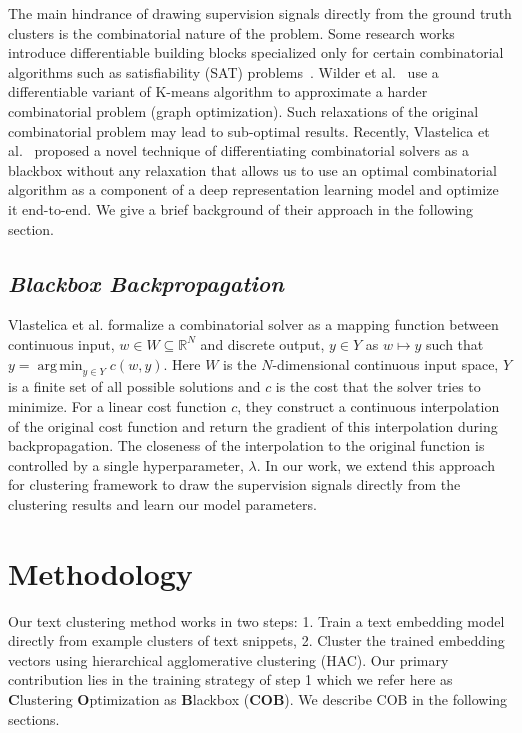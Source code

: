 \documentclass[11pt,a4paper]{article}
\DeclareMathOperator*{\argmin}{arg\,min}
\begin{document}
The main hindrance of drawing supervision signals directly from the ground truth clusters is the combinatorial nature of the problem. Some research works introduce differentiable building blocks specialized only for certain combinatorial algorithms such as satisfiability (SAT) problems~\cite{wang2019satnet}. Wilder et al.~\cite{wilder2019end} use a differentiable variant of K-means algorithm to approximate a harder combinatorial problem (graph optimization). Such relaxations of the original combinatorial problem may lead to sub-optimal results. Recently, Vlastelica et al.~\cite{vlastelica2019differentiation} proposed a novel technique of differentiating combinatorial solvers as a blackbox without any relaxation that allows us to use an optimal combinatorial algorithm as a component of a deep representation learning model and optimize it end-to-end. We give a brief background of their approach in the following section.

\subsection{\textit{Blackbox Backpropagation}}\label{sec:bb} Vlastelica et al. formalize a combinatorial solver as a mapping function between continuous input, $w \in W \subseteq \mathbb{R}^N$ and discrete output, $y \in Y$ as $w \mapsto y$ such that $y=\argmin_{y \in Y} c(w,y)$. Here $W$ is the $N$-dimensional continuous input space, $Y$ is a finite set of all possible solutions and $c$ is the cost that the solver tries to minimize. For a linear cost function $c$, they construct a continuous interpolation of the original cost function and return the gradient of this interpolation during backpropagation. The closeness of the interpolation to the original function is controlled by a single hyperparameter, $\lambda$. In our work, we extend this approach for clustering framework to draw the supervision signals directly from the clustering results and learn our model parameters.

\section{Methodology}
Our text clustering method works in two steps: 1. Train a text embedding model directly from example clusters of text snippets, 2. Cluster the trained embedding vectors using hierarchical agglomerative clustering (HAC). Our primary contribution lies in the training strategy of step 1 which we refer here as \textbf{C}lustering \textbf{O}ptimization as \textbf{B}lackbox (\textbf{COB}). We describe COB in the following sections.
\end{document}
